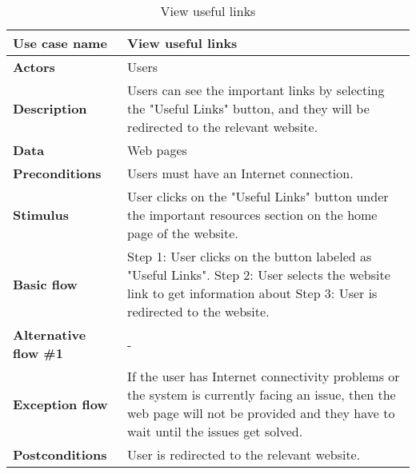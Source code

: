 \documentclass[listof=nochaptergap]{report}
\begin{document}
    \begin{table}[H]
        \centering
         \begin{tabular}{| p{4cm} | p{10cm} |} 
         \hline
         \textbf{Use case name} & View useful links \\
         \hline
         \textbf{Actors} & Users \\
         \hline
         \textbf{Description} & Users can see the important links by selecting the "Useful Links" button, and they will be redirected to the relevant website. \\
         \hline
         \textbf{Data} & Web pages \\
         \hline
         \textbf{Preconditions} & Users must have an Internet connection. \\
         \hline
         \textbf{Stimulus} & User clicks on the "Useful Links" button under the important resources section on the home page of the website. \\
         \hline
         \textbf{Basic flow} & Step 1: User clicks on the button labeled as "Useful Links". \newline Step 2: User selects the website link to get information about \newline Step 3: User is redirected to the website. \\
         \hline
         \textbf{Alternative flow \#1} & - \\
         \hline
         \textbf{Exception flow} & If the user has Internet connectivity problems or the system is currently facing an issue, then the web page will not be provided and they have to wait until the issues get solved. \\
         \hline
         \textbf{Postconditions} & User is redirected to the relevant website. \\
         \hline
         \end{tabular}
        \caption{View useful links}
        \label{tab:table3}
    \end{table}
\end{document}
